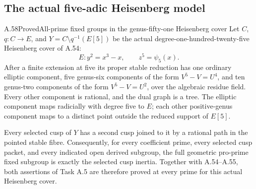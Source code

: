 \subsection{The actual five-adic Heisenberg model}

\begin{statement}{A.58}{Proved}{All-prime fixed groups in the genus-fifty-one Heisenberg cover}
Let \(C\), \(q:C\to E\), and \(Y=C\setminus q^{-1}(E[5])\)
be the actual degree-one-hundred-twenty-five Heisenberg cover of A.54:
\[
              E:y^2=x^3-x,\qquad z^5=\psi _5(x).
\]
After a finite extension at five its proper stable reduction has
one ordinary elliptic component, five genus-six components of the
form \(V^5-V=U^4\), and ten genus-two components of the form
\(V^5-V=U^2\), over the algebraic residue field. Every other
component is rational, and the dual graph is a tree. The elliptic
component maps radicially with degree five to \(E\); each other
positive-genus component maps to a distinct point outside the
reduced support of \(E[5]\).

Every selected cusp of \(Y\) has a second cusp joined to it by
a rational path in the pointed stable fibre. Consequently, for
every coefficient prime, every selected cusp packet, and every
indicated open derived subgroup, the full geometric pro-prime
fixed subgroup is exactly the selected cusp inertia. Together
with A.54--A.55, both assertions of Task A.5 are therefore proved
at every prime for this actual Heisenberg cover.
\end{statement}

